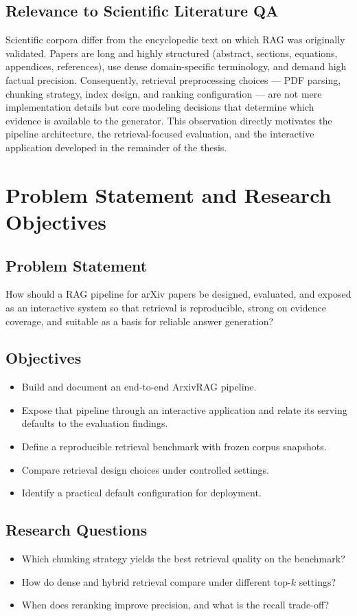 \documentclass[12pt,a4paper,titlepage,oneside]{book}
\begin{document}
\section{Relevance to Scientific Literature QA}
Scientific corpora differ from the encyclopedic text on which RAG was originally validated. Papers are long and highly structured (abstract, sections, equations, appendices, references), use dense domain-specific terminology, and demand high factual precision. Consequently, retrieval preprocessing choices — PDF parsing, chunking strategy, index design, and ranking configuration — are not mere implementation details but core modeling decisions that determine which evidence is available to the generator. This observation directly motivates the pipeline architecture, the retrieval-focused evaluation, and the interactive application developed in the remainder of the thesis.

\chapter{Problem Statement and Research Objectives}

\section{Problem Statement}
How should a RAG pipeline for arXiv papers be designed, evaluated, and exposed as an interactive system so that retrieval is reproducible, strong on evidence coverage, and suitable as a basis for reliable answer generation?

\section{Objectives}
\begin{itemize}
    \item Build and document an end-to-end ArxivRAG pipeline.
    \item Expose that pipeline through an interactive application and relate its serving defaults to the evaluation findings.
    \item Define a reproducible retrieval benchmark with frozen corpus snapshots.
    \item Compare retrieval design choices under controlled settings.
    \item Identify a practical default configuration for deployment.
\end{itemize}

\section{Research Questions}
\begin{itemize}
    \item Which chunking strategy yields the best retrieval quality on the benchmark?
    \item How do dense and hybrid retrieval compare under different top-$k$ settings?
    \item When does reranking improve precision, and what is the recall trade-off?
\end{itemize}
\end{document}
